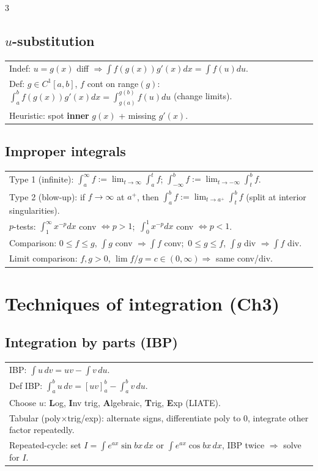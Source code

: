 \documentclass[10pt]{article}
\begin{document}
\begin{multicols}{3}
\subsection*{$u$-substitution}
\vspace{-1pt}
\begin{tabular}{@{}p{}@{}}
Indef: $u=g(x)$ diff $\Rightarrow\int f(g(x))g'(x)dx=\int f(u)du$.\\
Def: $g\in C^1[a,b]$, $f$ cont on range$(g)$:\ $\int_a^b f(g(x))g'(x)dx=\int_{g(a)}^{g(b)} f(u)du$ (change limits).\\
Heuristic: spot \textbf{inner} $g(x)$ + missing $g'(x)$.\\
\end{tabular}

\subsection*{Improper integrals}
\vspace{-1pt}
\begin{tabular}{@{}p{}@{}}
Type 1 (infinite): $\int_a^{\infty} f:=\lim_{t\to\infty}\int_a^t f$; $\int_{-\infty}^b f:=\lim_{t\to-\infty}\int_t^b f$.\\
Type 2 (blow-up): if $f\to\infty$ at $a^+$, then $\int_a^b f:=\lim_{t\to a^+}\int_t^b f$ (split at interior singularities).\\
$p$-tests: $\int_1^{\infty} x^{-p}dx$ conv $\Leftrightarrow p>1$;\ $\int_0^1 x^{-p}dx$ conv $\Leftrightarrow p<1$.\\
Comparison: $0\le f\le g$, $\int g$ conv $\Rightarrow\int f$ conv;\ $0\le g\le f$, $\int g$ div $\Rightarrow\int f$ div.\\
Limit comparison: $f,g>0$, $\lim f/g=c\in(0,\infty)\Rightarrow$ same conv/div.\\
\end{tabular}

\section*{Techniques of integration (Ch3)}

\subsection*{Integration by parts (IBP)}
\vspace{-1pt}
\begin{tabular}{@{}p{}@{}}
IBP: $\displaystyle\int u\,dv=uv-\int v\,du$.\\
Def IBP: $\displaystyle\int_a^b u\,dv=[uv]_a^b-\int_a^b v\,du$.\\
Choose $u$: \textbf{L}og, \textbf{I}nv trig, \textbf{A}lgebraic, \textbf{T}rig, \textbf{E}xp (LIATE).\\
Tabular (poly$\times$trig/exp): alternate signs, differentiate poly to $0$, integrate other factor repeatedly.\\
Repeated-cycle: set $I=\int e^{ax}\sin bx\,dx$ or $\int e^{ax}\cos bx\,dx$, IBP twice $\Rightarrow$ solve for $I$.\\
\end{tabular}


\end{multicols}
\end{document}
